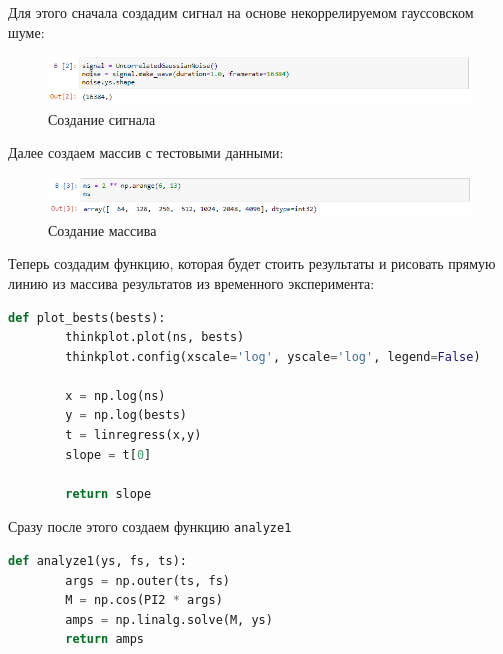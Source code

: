 \documentclass[a4paper]{article}
\begin{document}
            Для этого сначала создадим сигнал на основе некоррелируемом гауссовском шуме:
            
            \begin{figure}[H]
                \centering
                \includegraphics[width=\textwidth]{ex_1_UGN_signal.png}
                \caption{Создание сигнала}
                \label{fig:ex_1_UGN_signal}
            \end{figure}
            
            Далее создаем массив с тестовыми данными:
            
            \begin{figure}[H]
                \centering
                \includegraphics[width=\textwidth]{ex_1_UGN_array.png}
                \caption{Создание массива}
                \label{fig:ex_1_UGN_array}
            \end{figure}
            
            Теперь создадим функцию, которая будет стоить результаты и рисовать прямую линию из массива результатов из временного эксперимента:
            
\begin{lstlisting}[language=Python, caption= Функция \texttt{plot-bests}]
    def plot_bests(bests):    
        thinkplot.plot(ns, bests)
        thinkplot.config(xscale='log', yscale='log', legend=False)
        
        x = np.log(ns)
        y = np.log(bests)
        t = linregress(x,y)
        slope = t[0]
    
        return slope
\end{lstlisting}
            
            Сразу после этого создаем функцию \texttt{analyze1}
            
\begin{lstlisting}[language=Python, caption= Функция \texttt{analyze1}]
    def analyze1(ys, fs, ts):
        args = np.outer(ts, fs)
        M = np.cos(PI2 * args)
        amps = np.linalg.solve(M, ys)
        return amps
\end{lstlisting}
            
\end{document}
